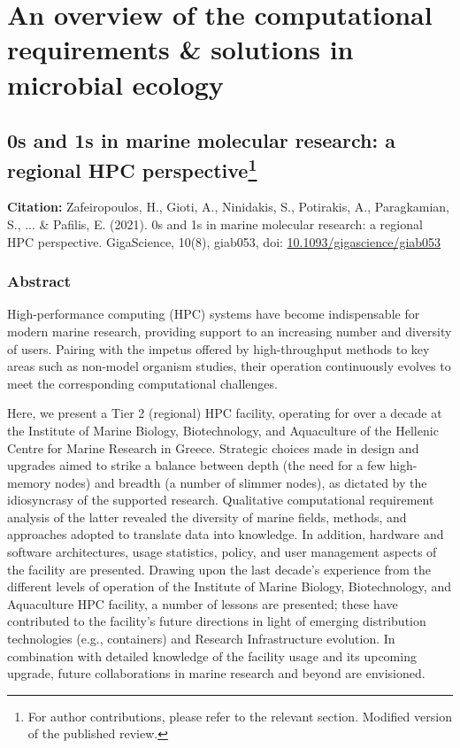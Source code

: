 % 
% 

\chapter{
   An overview of the computational requirements \& solutions in microbial ecology
}
\label{cha:hpc}

\section[0s and 1s in marine molecular research: a regional HPC perspective]{
   0s and 1s in marine molecular research: a regional HPC perspective\footnote{
      For author contributions, please refer to the relevant section. Modified version of the published review.
   } 
}

\textbf{Citation:}
Zafeiropoulos, H., Gioti, A., Ninidakis, S., Potirakis, A., Paragkamian, S., ... \& 
Pafilis, E. (2021). 0s and 1s in marine molecular research: a regional HPC perspective. 
GigaScience, 10(8), giab053, doi: \href{https://doi.org/10.1093/gigascience/giab053}{10.1093/gigascience/giab053}


   \subsection{Abstract}
   High-performance computing (HPC) systems have become indispensable for modern marine research, 
   providing support to an increasing number and diversity of users. Pairing with the impetus 
   offered by high-throughput methods to key areas such as non-model organism studies, their 
   operation continuously evolves to meet the corresponding computational challenges. 

   Here, we present a Tier 2 (regional) HPC facility, operating for over a decade at the 
   Institute of Marine Biology, Biotechnology, and Aquaculture of the Hellenic Centre for Marine Research in Greece. 
   Strategic choices made in design and upgrades aimed to strike a balance between depth 
   (the need for a few high-memory nodes) and breadth (a number of slimmer nodes), as dictated by the 
   idiosyncrasy of the supported research. 
   Qualitative computational requirement analysis of the latter revealed the diversity of marine fields, 
   methods, and approaches adopted to translate data into knowledge. 
   In addition, hardware and software architectures, usage statistics, policy, and user management aspects 
   of the facility are presented. Drawing upon the last decade's experience from the different levels of operation 
   of the Institute of Marine Biology, Biotechnology, and Aquaculture HPC facility, a number of lessons are presented; 
   these have contributed to the facility's future directions in light of emerging distribution technologies (e.g., containers) 
   and Research Infrastructure evolution. 
   In combination with detailed knowledge of the facility usage and its upcoming upgrade, 
   future collaborations in marine research and beyond are envisioned.



